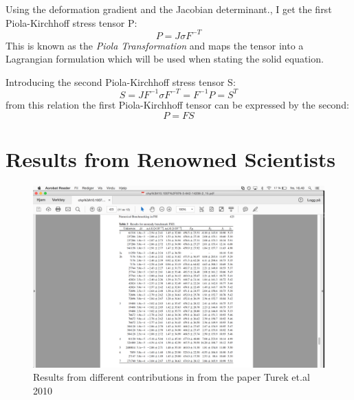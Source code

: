 Using the deformation gradient and the Jacobian determinant., I get the first Piola-Kirchhoff stress tensor P:
\begin{equation}
 P = J \sigma F^{-T} 
\end{equation}
This is known as the \textit{Piola Transformation} and maps the tensor into a Lagrangian formulation which will be used when stating the solid equation.

Introducing the second Piola-Kirchhoff stress tensor S:
\begin{equation}
S = J F^{-1}\sigma F^{-T} = F^{-1} P = S^T 
\end{equation}
from this relation the first Piola-Kirchhoff tensor can be expressed by the second:
\begin{equation}
P = FS
\end{equation}

\chapter{Results from Renowned Scientists}\label{sec:bigboys}
\begin{figure}[H]
\includegraphics[scale=0.6,trim={12cm 0cm 16.3cm 5.5cm},clip]{./Appendix/BigBoyResults.png}
\caption{Results from different contributions in from the paper Turek et.al 2010 \cite{Turek2010}}
\end{figure}










